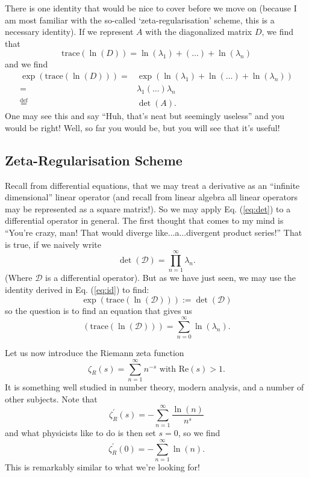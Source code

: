 There is one identity that would be nice to cover before we move
on (because I am most familiar with the so-called
`zeta-regularisation' scheme, this is a necessary identity). If
we represent $A$ with the diagonalized matrix $D$, we find that
\begin{equation}
\text{trace}(\ln(D)) = \ln(\lambda_{1}) + (\ldots) +\ln(\lambda_{n})
\end{equation}
and we find
\begin{equation}
\begin{split}
\exp{(\text{trace}(\ln(D)))}  = &  \exp{(\ln(\lambda_{1}) + \ln(\ldots) + \ln(\lambda_{n}))}\\
 = & \lambda_{1}(\ldots)\lambda_{n} \\
 \stackrel{\text{def}}{=} & \det{(A)}.
\end{split}
\label{eq:id}
\end{equation}
One may see this and say ``Huh, that's neat but seemingly useless'' and you would be right! Well, so far you would be, but you will see that it's useful!

\subsection{Zeta-Regularisation Scheme}

Recall from differential equations, that we may treat a derivative as an ``infinite dimensional'' linear operator (and recall from linear algebra all linear operators may be represented as a square matrix!). So we may apply Eq. (\ref{eq:det}) to a differential operator in general. The first thought that comes to my mind is ``You're crazy, man! That would diverge like...a...divergent product series!'' That is true, if we naively write
\begin{equation}
\det{(\mathcal{D})} = \prod^{\infty}_{n=1}\lambda_{n}.
\end{equation}
(Where $\mathcal{D}$ is a differential operator). But as we have just seen, we may use the identity derived in Eq. (\ref{eq:id}) to find:
\begin{equation}
\exp{(\text{trace}(\ln(\mathcal{D})))} := \det{(\mathcal{D})}
\end{equation}
so the question is to find an equation that gives us
\begin{equation}
(\text{trace}(\ln(\mathcal{D}))) = \sum^{\infty}_{n=0}\ln{(\lambda_{n})}.
\end{equation}

Let us now introduce the Riemann zeta function
\begin{equation}
\zeta_{R}(s) = \sum^{\infty}_{n=1}n^{-s} \mbox{  with  } \text{Re}(s)>1.
\end{equation}
It is something well studied in number theory, modern analysis, and a number of other subjects. Note that
\begin{equation}
\zeta^{\prime}_{R}(s) = -\sum^{\infty}_{n=1}\frac{\ln{(n)}}{n^{s}}
\end{equation}
and what physicists like to do is then set $s=0$, so we find
\begin{equation}
\zeta^{\prime}_{R}(0) = -\sum^{\infty}_{n=1}\ln{(n)}.
\end{equation}
This is remarkably similar to what we're looking for!

